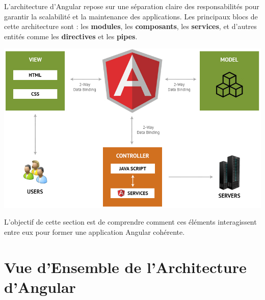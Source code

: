 \documentclass{article}
\begin{document}
L’architecture d’Angular repose sur une séparation claire des responsabilités pour garantir la scalabilité et la maintenance des applications. Les principaux blocs de cette architecture sont : les \textbf{modules}, les \textbf{composants}, les \textbf{services}, et d'autres entités comme les \textbf{directives} et les \textbf{pipes}.
\begin{tcolorbox}[colframe=black!70, colback=white, title=Figure 2: Architecture d'Angular, fonttitle=\bfseries]
\centering
\includegraphics[width=\textwidth]{images/MVC-Architecture-is-Perfect.jpg}
\end{tcolorbox}
L’objectif de cette section est de comprendre comment ces éléments interagissent entre eux pour former une application Angular cohérente.

\section{Vue d’Ensemble de l’Architecture d'Angular}
\end{document}
